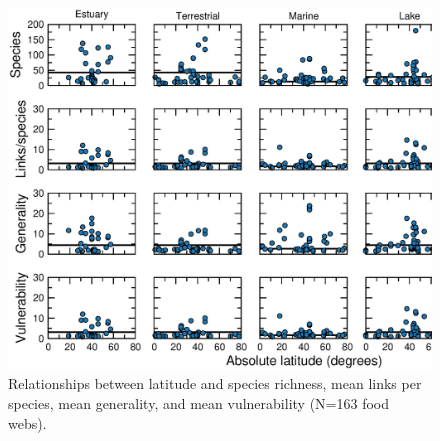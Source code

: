 \documentclass[12pt]{article}
\begin{document}


\begin{figure}[!h]
\label{props_v_lat}
\includegraphics[width=.9\textwidth]{Figures/by_TL/properties_vs_lat/proportions/nonts_propsvlat.eps}
\caption{Relationships between latitude and species richness, mean links per species, mean generality, and mean vulnerability (N=163 food webs). }
\end{figure}
\end{document}
